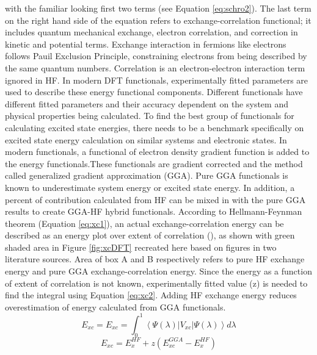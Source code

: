 \documentclass[
journal=jpcbfk, %
manuscript=article]{achemso}
\begin{document}
	with the familiar looking first two terms (see Equation \ref{eq:schro2}). The last term on the right hand side of the equation refers to exchange-correlation functional; it includes quantum mechanical exchange, electron correlation, and correction in kinetic and potential terms. Exchange interaction in fermions like electrons follows Pauil Exclusion Principle, constraining electrons from being described by the same quantum numbers. Correlation is an electron-electron interaction term ignored in HF. In modern DFT functionals, experimentally fitted parameters are used to describe these energy functional components.\cite{Cramer2005} Different functionals have different fitted parameters and their accuracy dependent on the system and physical properties being calculated. To find the best group of functionals for calculating excited state energies, there needs to be a benchmark specifically on excited state energy calculation on similar systems and electronic states. In modern functionals, a functional of electron density gradient function is added to the energy functionals.These functionals are gradient corrected and the method called generalized gradient approximation (GGA). Pure GGA functionals is known to underestimate system energy\cite{Heßelmann2015,Hirao2011, Parac2002, Jacquemin2009} or excited state energy\cite{Caricato2010, Barnes2014}.  In addition, a percent of contribution calculated from HF can be mixed in with the pure GGA results to create GGA-HF hybrid functionals. According to Hellmann-Feynman theorem (Equation \ref{eq:xc1}), an actual exchange-correlation energy can be described as an energy plot over extent of correlation (\textlambda), as shown with green shaded area in Figure \ref{fig:xcDFT} recreated here based on figures in two literature sources.\cite{Cramer2005, Bersier} Area of box A and B respectively refers to pure HF exchange energy and pure GGA exchange-correlation energy. Since the energy as a function of extent of correlation is not known, experimentally fitted value (z) is needed to find the integral using Equation \ref{eq:xc2}. Adding HF exchange energy reduces overestimation of energy calculated from GGA functionals.
	\begin{equation}
	\label{eq:xc1}
	E_{xc}=E_{xc}=\int_{0}^{1}\left \langle \Psi (\lambda)\left | V_{xc} \right | \Psi (\lambda)\right \rangle d\lambda
	\end{equation}
	\begin{equation}
	\label{eq:xc2}
	E_{xc}=E_{x}^{HF}+z(E_{xc}^{GGA}-E_{x}^{HF})
	\end{equation}
\end{document}
